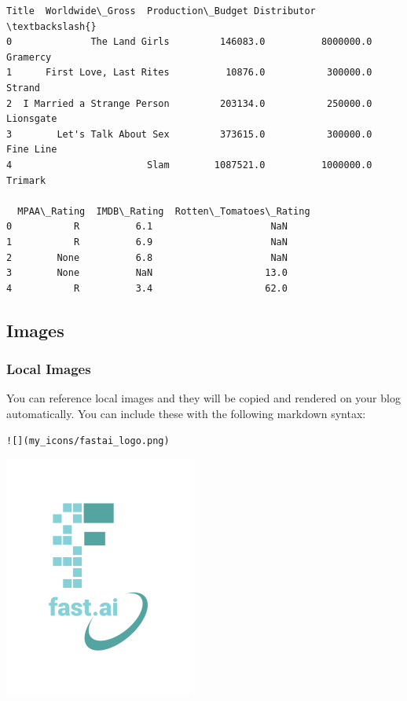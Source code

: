 \documentclass[11pt]{article}
\makeatletter
\newcommand{\boxspacing}{\kern\kvtcb@left@rule\kern\kvtcb@boxsep}
\newcommand{\prompt}[4]{
        \ttfamily\llap{{\color{#2}[#3]:\hspace{3pt}#4}}\vspace{-\baselineskip}
    }
\makeatother
\begin{document}
            \begin{tcolorbox}[breakable, size=fbox, boxrule=.5pt, pad at break*=1mm, opacityfill=0]
\prompt{Out}{outcolor}{11}{\boxspacing}
\begin{Verbatim}[commandchars=\\\{\}]
                        Title  Worldwide\_Gross  Production\_Budget Distributor  \textbackslash{}
0              The Land Girls         146083.0          8000000.0    Gramercy
1      First Love, Last Rites          10876.0           300000.0      Strand
2  I Married a Strange Person         203134.0           250000.0   Lionsgate
3        Let's Talk About Sex         373615.0           300000.0   Fine Line
4                        Slam        1087521.0          1000000.0     Trimark

  MPAA\_Rating  IMDB\_Rating  Rotten\_Tomatoes\_Rating
0           R          6.1                     NaN
1           R          6.9                     NaN
2        None          6.8                     NaN
3        None          NaN                    13.0
4           R          3.4                    62.0
\end{Verbatim}
\end{tcolorbox}
        
    \hypertarget{images}{%
\subsection{Images}\label{images}}

\hypertarget{local-images}{%
\subsubsection{Local Images}\label{local-images}}

You can reference local images and they will be copied and rendered on
your blog automatically. You can include these with the following
markdown syntax:

\texttt{!{[}{]}(my\_icons/fastai\_logo.png)}

    \includegraphics{my_icons/fastai_logo.png}
\end{document}
